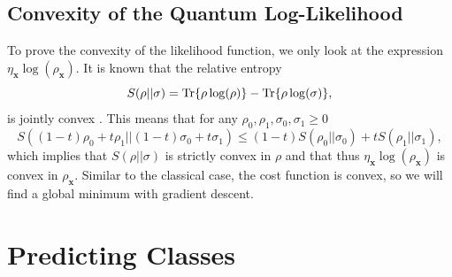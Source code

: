 \subsection{Convexity of the Quantum Log-Likelihood}\label{sec:convexity_qlh}

To prove the convexity of the likelihood function, we only look at the expression $\eta_\mathbf{x} \log (\rho_\mathbf{x})$. It is known that the relative entropy
\begin{equation*}
    S(\rho || \sigma) = \Tr{\rho \log(\rho)} - \Tr{\rho \log(\sigma)},
\end{equation*}
is jointly convex \cite{Carlen2009}. This means that for any $\rho_0, \rho_1, \sigma_0, \sigma_1 \geq 0$
\begin{equation*}
    S((1-t)\rho_0 + t \rho_1 || (1-t)\sigma_0 + t \sigma_1) \leq (1-t) S(\rho_0||\sigma_0) + t S(\rho_1||\sigma_1),
\end{equation*}
which implies that $S(\rho || \sigma)$ is strictly convex in $\rho$ and that thus $\eta_\mathbf{x} \log (\rho_\mathbf{x})$ is convex in $\rho_\mathbf{x}$. Similar to the classical case, the cost function is convex, so we will find a global minimum with gradient descent.

\section{Predicting Classes}

